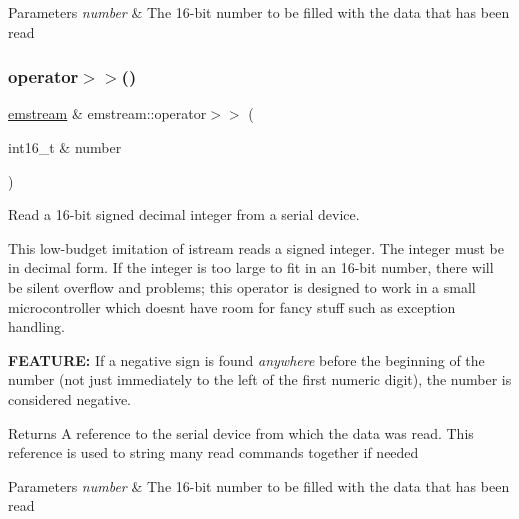\begin{DoxyParams}{Parameters}
{\em number} & The 16-\/bit number to be filled with the data that has been read \\
\hline
\end{DoxyParams}
\mbox{\label{classemstream_a3e646639a87845b68c8f12b1e763a2a2}} 
\subsubsection{\texorpdfstring{operator$>$$>$()}{operator>>()}\hspace{0.1cm}{\footnotesize\ttfamily [5/8]}}
{\footnotesize\ttfamily \mbox{\hyperlink{classemstream}{emstream}} \& emstream\+::operator$>$$>$ (\begin{DoxyParamCaption}\item[{int16\+\_\+t \&}]{number }\end{DoxyParamCaption})}



Read a 16-\/bit signed decimal integer from a serial device. 

This low-\/budget imitation of {\ttfamily istream} reads a signed integer. The integer must be in decimal form. If the integer is too large to fit in an 16-\/bit number, there will be silent overflow and problems; this operator is designed to work in a small microcontroller which doesn\textquotesingle{}t have room for fancy stuff such as exception handling. \begin{DoxyItemize}
\item {\bfseries F\+E\+A\+T\+U\+RE\+:} If a negative sign is found {\itshape anywhere} before the beginning of the number (not just immediately to the left of the first numeric digit), the number is considered negative. \begin{DoxyReturn}{Returns}
A reference to the serial device from which the data was read. This reference is used to string many read commands together if needed 
\end{DoxyReturn}

\begin{DoxyParams}{Parameters}
{\em number} & The 16-\/bit number to be filled with the data that has been read \\
\hline
\end{DoxyParams}
\end{DoxyItemize}
\mbox{\label{classemstream_a52f02a96f606f479538518944a6666e4}} 
